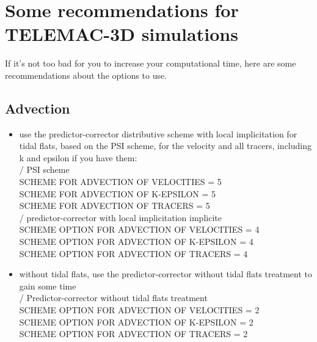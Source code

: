 \chapter{Some recommendations for TELEMAC-3D simulations}

If it's not too bad for you to increase your computational time, here are some recommendations about the options to use.

\section{Advection}
\begin{itemize}
\item use the predictor-corrector distributive scheme with local implicitation for tidal flats, based on the PSI scheme, for the velocity and all tracers, including k and epsilon if you have them:\\
  / PSI scheme\\
  SCHEME FOR ADVECTION OF VELOCITIES = 5\\
  SCHEME FOR ADVECTION OF K-EPSILON = 5\\
  SCHEME FOR ADVECTION OF TRACERS = 5\\
  / predictor-corrector with local implicitation implicite\\
  SCHEME OPTION FOR ADVECTION OF VELOCITIES = 4\\
  SCHEME OPTION FOR ADVECTION OF K-EPSILON = 4\\
  SCHEME OPTION FOR ADVECTION OF TRACERS = 4\\
\item without tidal flats, use the predictor-corrector without tidal flats treatment to gain some time\\
  / Predictor-corrector without tidal flats treatment\\
  SCHEME OPTION FOR ADVECTION OF VELOCITIES = 2\\
  SCHEME OPTION FOR ADVECTION OF K-EPSILON = 2\\
  SCHEME OPTION FOR ADVECTION OF TRACERS = 2\\
\end{itemize}
